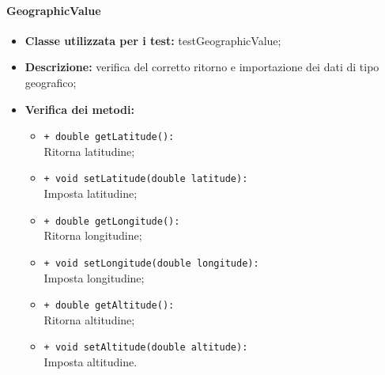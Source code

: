 \paragraph{GeographicValue}
\begin{flushleft}
\begin{itemize}
\item \textbf{Classe utilizzata per i test:} testGeographicValue;
\item \textbf{Descrizione:} verifica del corretto ritorno e importazione dei dati di tipo geografico;
\item \textbf{Verifica dei metodi:}
\begin{sloppypar}
\begin{itemize}
\item \texttt{+ double getLatitude():}\\ Ritorna latitudine;
\item \texttt{+ void setLatitude(double latitude):}\\ Imposta latitudine;
\item \texttt{+ double getLongitude():}\\ Ritorna longitudine;
\item \texttt{+ void setLongitude(double longitude):}\\ Imposta longitudine;
\item \texttt{+ double getAltitude():}\\ Ritorna altitudine;
\item \texttt{+ void setAltitude(double altitude):}\\ Imposta altitudine.
\end{itemize}
\end{sloppypar}
\end{itemize}
\end{flushleft}


